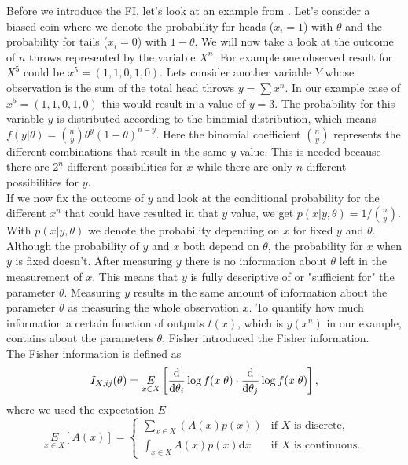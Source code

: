 Before we introduce the FI, let's look at an example from \cite{StatisticFisherInfoTutorial}. Let's consider a biased coin where we denote the probability for heads ($x_i = 1$) with $\theta$ and the probability for tails ($x_i = 0$) with $1-\theta$. We will now take a look at the outcome of $n$ throws represented by the variable $X^n$. For example one observed result for $X^5$ could be $x^5 = (1,1,0,1,0)$. Lets consider another variable $Y$ whose observation is the sum of the total head throws $y = \sum x^n$. In our example case of $x^5 = (1,1,0,1,0)$ this would result in a value of $y = 3$. The probability for this variable $y$ is distributed according to the binomial distribution, which means $f(y|\theta) = \binom{n}{y}\theta^y (1-\theta)^{n-y}$. Here the binomial coefficient $\binom{n}{y}$ represents the different combinations that result in the same $y$ value. This is needed because there are $2^n$ different possibilities for $x$ while there are only $n$ different possibilities for $y$.\\
If we now fix the outcome of $y$ and look at the conditional probability for the different $x^n$ that could have resulted in that $y$ value, we get $p(x|y,\theta) = 1/ \binom{n}{y}$. With $p(x|y,\theta)$ we denote the probability depending on $x$ for fixed $y$ and $\theta$. Although the probability of $y$ and $x$ both depend on $\theta$, the probability for $x$ when $y$ is fixed doesn't. After measuring $y$ there is no information about $\theta$ left in the measurement of $x$. This means that $y$ is fully descriptive of or "sufficient for" the parameter $\theta$. Measuring $y$ results in the same amount of information about the parameter $\theta$ as measuring the whole observation $x$. To quantify how much information a certain function of outputs $t(x)$, which is $y(x^n)$ in our example, contains about the parameters $\theta$, Fisher introduced the Fisher information.\\
The Fisher information is defined as 
\begin{equation}\label{eq:FIDefinition}
	I_{X,ij}(\theta) = \underset{x\in X}{E} \left[\frac{\mathrm{d}}{\mathrm{d}\theta_i}\log f(x|\theta) \cdot \frac{\mathrm{d}}{\mathrm{d}\theta_j}\log f(x|\theta)\right],
\end{equation}
where we used the expectation $E$
\begin{equation}
	\underset{x\in X}{E} \left[A(x)\right] = 
	\begin{cases}
		\sum_{x\in X} \left(A(x) p(x)\right) &\text{if $X$ is discrete},\\
		\int_{x\in X} A(x) p(x) \mathrm{d}x &\text{if $X$ is continuous}.
	\end{cases}
\end{equation}
